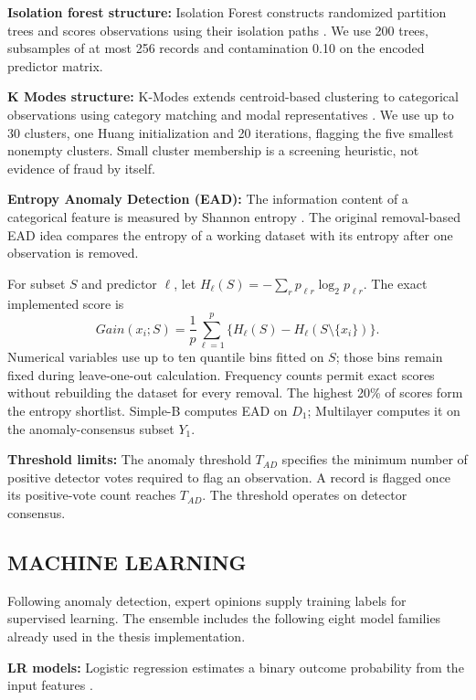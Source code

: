 \textbf{Isolation forest structure:} Isolation Forest constructs randomized
partition trees and scores observations using their isolation paths
\citep{Liu2008}. We use 200 trees, subsamples of at most 256 records and
contamination 0.10 on the encoded predictor matrix.

\textbf{K Modes structure:} K-Modes extends centroid-based clustering to
categorical observations using category matching and modal representatives
\citep{Huang1998}. We use up to 30 clusters, one Huang initialization and
20 iterations, flagging the five smallest nonempty clusters. Small cluster
membership is a screening heuristic, not evidence of fraud by itself.

\textbf{Entropy Anomaly Detection (EAD):} The information content of a
categorical feature is measured by Shannon entropy \citep{Shannon1948}.
The original removal-based EAD idea compares the entropy of a working
dataset with its entropy after one observation is removed.
\begin{revised}
For subset $S$ and predictor $\ell$, let
$H_\ell(S)=-\sum_r p_{\ell r}\log_2p_{\ell r}$.
The exact implemented score is
\begin{equation}\label{eq:entropy}
Gain(x_i;S)=\frac{1}{p}\sum_{\ell=1}^{p}
\{H_\ell(S)-H_\ell(S\setminus\{x_i\})\}.
\end{equation}
Numerical variables use up to ten quantile bins fitted on $S$; those bins
remain fixed during leave-one-out calculation. Frequency counts permit
exact scores without rebuilding the dataset for every removal. The highest
20\% of scores form the entropy shortlist. Simple-B computes EAD on $D_1$;
Multilayer computes it on the anomaly-consensus subset $Y_1$.
\end{revised}

\textbf{Threshold limits:} The anomaly threshold $T_{AD}$ specifies the
minimum number of positive detector votes required to flag an observation.
A record is flagged once its positive-vote count reaches $T_{AD}$.
The threshold operates on detector consensus.

\subsection{MACHINE LEARNING}\label{SSC:ML}
Following anomaly detection, expert opinions supply training labels for
supervised learning. The ensemble includes the following eight model
families already used in the thesis implementation.

\textbf{LR models:} Logistic regression estimates a binary outcome
probability from the input features \citep{Hastie2009}.

